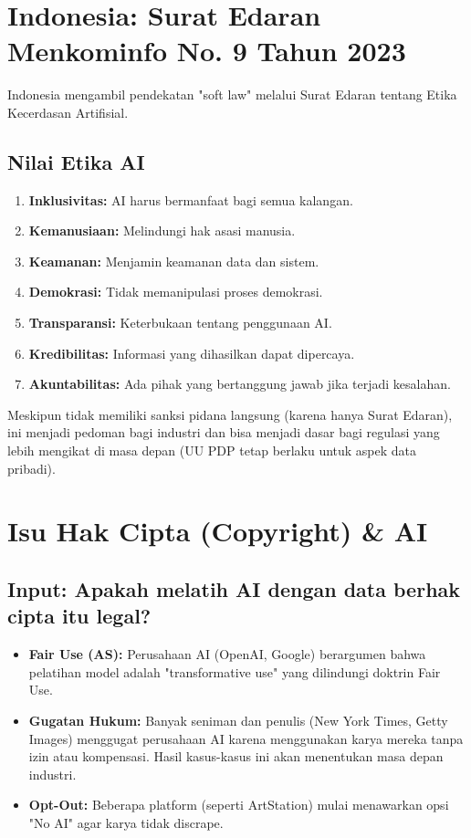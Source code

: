 \section{Indonesia: Surat Edaran Menkominfo No. 9 Tahun 2023}
Indonesia mengambil pendekatan "soft law" melalui Surat Edaran tentang Etika Kecerdasan Artifisial.

\subsection{Nilai Etika AI}
\begin{enumerate}
    \item \textbf{Inklusivitas:} AI harus bermanfaat bagi semua kalangan.
    \item \textbf{Kemanusiaan:} Melindungi hak asasi manusia.
    \item \textbf{Keamanan:} Menjamin keamanan data dan sistem.
    \item \textbf{Demokrasi:} Tidak memanipulasi proses demokrasi.
    \item \textbf{Transparansi:} Keterbukaan tentang penggunaan AI.
    \item \textbf{Kredibilitas:} Informasi yang dihasilkan dapat dipercaya.
    \item \textbf{Akuntabilitas:} Ada pihak yang bertanggung jawab jika terjadi kesalahan.
\end{enumerate}
Meskipun tidak memiliki sanksi pidana langsung (karena hanya Surat Edaran), ini menjadi pedoman bagi industri dan bisa menjadi dasar bagi regulasi yang lebih mengikat di masa depan (UU PDP tetap berlaku untuk aspek data pribadi).

\section{Isu Hak Cipta (Copyright) & AI}

\subsection{Input: Apakah melatih AI dengan data berhak cipta itu legal?}
\begin{itemize}
    \item \textbf{Fair Use (AS):} Perusahaan AI (OpenAI, Google) berargumen bahwa pelatihan model adalah "transformative use" yang dilindungi doktrin Fair Use.
    \item \textbf{Gugatan Hukum:} Banyak seniman dan penulis (New York Times, Getty Images) menggugat perusahaan AI karena menggunakan karya mereka tanpa izin atau kompensasi. Hasil kasus-kasus ini akan menentukan masa depan industri.
    \item \textbf{Opt-Out:} Beberapa platform (seperti ArtStation) mulai menawarkan opsi "No AI" agar karya tidak discrape.
\end{itemize}


